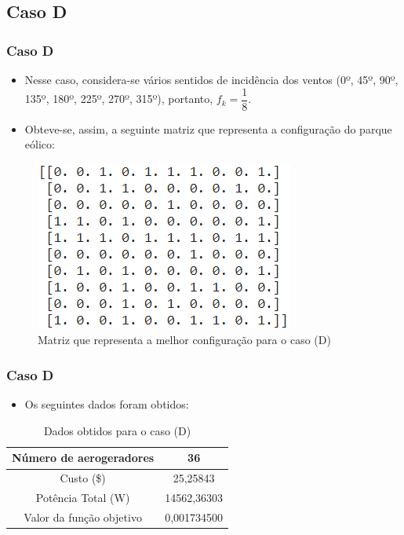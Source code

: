 \documentclass{beamer}
\begin{document}
	\subsection{Caso D}
	\begin{frame}
		\frametitle{Caso D}
		\begin{itemize}
			\item Nesse caso, considera-se vários sentidos de incidência dos ventos (0º, 45º, 90º, 135º, 180º, 225º, 270º, 315º), portanto, $ f_k = \dfrac{1}{8} $.
			\item Obteve-se, assim, a seguinte matriz que representa a configuração do parque eólico:
		\end{itemize}
		\begin{figure}[H]
			\centering
			\includegraphics[width=0.5\linewidth]{caso_d}
			\caption{Matriz que representa a melhor configuração para o caso (D)}
			\label{fig:casod}
		\end{figure}
	\end{frame}
	
	\begin{frame}
		\frametitle{Caso D}
		\begin{itemize}
			\item Os seguintes dados foram obtidos:
		\end{itemize}
			\begin{table}[H]
			\centering
			\begin{tabular}{|c|c|}
				\hline
				Número de aerogeradores & 36 \\
				\hline
				Custo (\$) & 25,25843 \\
				\hline
				Potência Total (W) & 14562,36303 \\
				\hline
				Valor da função objetivo & 0,001734500 \\
				\hline
			\end{tabular}
			\caption{Dados obtidos para o caso (D)}
			\label{tab:casod}
		\end{table}	
	\end{frame}
	
\end{document}
